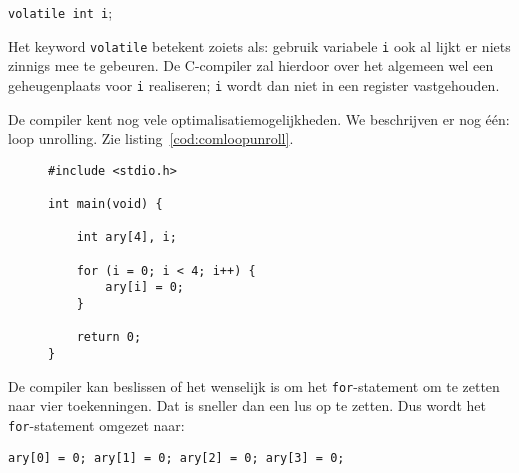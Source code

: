 \hspace*{1em}\texttt{volatile int i};

Het keyword \texttt{volatile} betekent zoiets als: gebruik variabele \texttt{i} ook al lijkt er niets zinnigs mee te gebeuren. De C-compiler zal hierdoor over het algemeen wel een geheugenplaats voor \texttt{i} realiseren; \texttt{i} wordt dan niet in een register vastgehouden.

De compiler kent nog vele optimalisatiemogelijkheden. We beschrijven er nog één: loop unrolling. Zie listing~\ref{cod:comloopunroll}.

\begin{figure}[!ht]
\begin{lstlisting}[caption=Een C-programma.,label=cod:comloopunroll]
#include <stdio.h>

int main(void) {

    int ary[4], i;
    
    for (i = 0; i < 4; i++) {
        ary[i] = 0;
    }
    
    return 0;
}
\end{lstlisting}
\end{figure}

De compiler kan beslissen of het wenselijk is om het \texttt{for}-statement om te zetten naar vier toekenningen. Dat is sneller dan een lus op te zetten. Dus wordt het \texttt{for}-statement omgezet naar:

\hspace*{1em}\texttt{ary[0] = 0; ary[1] = 0; ary[2] = 0; ary[3] = 0;}

